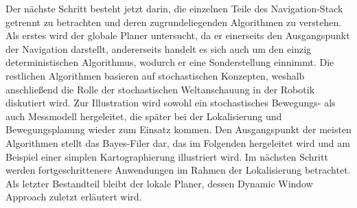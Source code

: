 Der nächste Schritt besteht jetzt darin, die einzelnen Teile des Navigation-Stack getrennt zu betrachten und deren zugrundeliegenden Algorithmen zu verstehen. Als erstes wird der globale Planer untersucht, da er einerseits den Ausgangspunkt der Navigation darstellt, andererseits handelt es sich auch um den einzig deterministischen Algorithmus, wodurch er eine Sonderstellung einnimmt. Die restlichen Algorithmen basieren auf stochastischen Konzepten, weshalb anschließend die Rolle der stochastischen Weltanschauung in der Robotik diskutiert wird. Zur Illustration wird sowohl ein stochastisches Bewegungs- als auch Messmodell hergeleitet, die später bei der Lokalisierung und Bewegungsplanung wieder zum Einsatz kommen. Den Ausgangspunkt der meisten Algorithmen stellt das Bayes-Filer dar, das im Folgenden hergeleitet wird und am Beispiel einer simplen Kartographierung illustriert wird. Im nächsten Schritt werden fortgeschrittenere Anwendungen im Rahmen der Lokalisierung betrachtet. Als letzter Bestandteil bleibt der lokale Planer, dessen Dynamic Window Approach zuletzt erläutert wird.